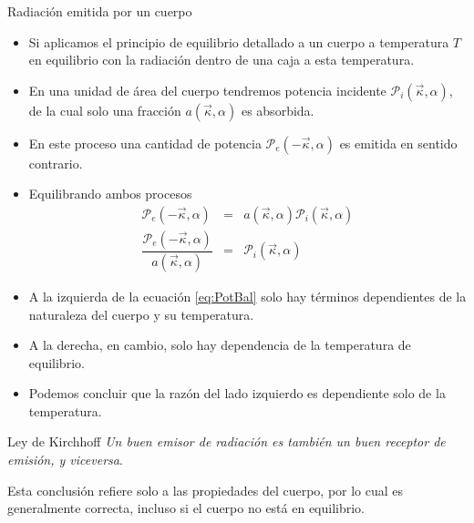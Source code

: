 \documentclass[aspectratio=1610]{beamer}
\newcommand{\kv}{\Vec{\kappa}}
\begin{document}
\begin{frame}{Radiación emitida por un cuerpo}
	\begin{itemize}
		\item Si aplicamos el principio de equilibrio detallado a un cuerpo a temperatura $T$ en equilibrio con la radiación dentro de una caja a esta temperatura.\pause
		\item En una unidad de área del cuerpo tendremos potencia incidente $\mathcal{P}_i(\kv,\alpha)$, de la cual solo una fracción $a(\kv,\alpha)$ es absorbida.\pause
		\item En este proceso una cantidad de potencia $\mathcal{P}_e(-\kv,\alpha)$ es emitida en sentido contrario.
		\item Equilibrando ambos procesos\pause
		\begin{equation}
			\begin{array}{rcl}
				\mathcal{P}_e(-\kv,\alpha) &=& a(\kv,\alpha) \mathcal{P}_i(\kv,\alpha) \\
				\dfrac{\mathcal{P}_e(-\kv,\alpha)}{a(\kv,\alpha)} &=& \mathcal{P}_i(\kv,\alpha)
			\end{array}
			\label{eq:PotBal}
		\end{equation}
	\end{itemize}
\end{frame}

\begin{frame}
	\begin{itemize}
		\item A la izquierda de la ecuación \ref{eq:PotBal} solo hay términos dependientes de la naturaleza del cuerpo y su temperatura.
		\item A la derecha, en cambio, solo hay dependencia de la temperatura de equilibrio.\pause
		\item Podemos concluir que la razón del lado izquierdo es dependiente solo de la temperatura.\pause
	\end{itemize}
	\begin{block}{Ley de Kirchhoff}
		\emph{Un buen emisor de radiación es también un buen receptor de emisión, y viceversa}.
		
		Esta conclusión refiere solo a las propiedades del cuerpo, por lo cual es generalmente correcta, incluso si el cuerpo no está en equilibrio.
	\end{block}
\end{frame}
\end{document}
